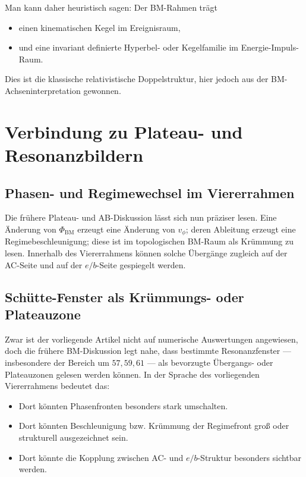 \documentclass[11pt,a4paper]{article}
\theoremstyle{definition}
\theoremstyle{plain}
\begin{document}
	Man kann daher heuristisch sagen: Der BM-Rahmen trägt
	\begin{itemize}[leftmargin=2em]
		\item einen kinematischen Kegel im Ereignisraum,
		\item und eine invariant definierte Hyperbel- oder Kegelfamilie im Energie-Impuls-Raum.
	\end{itemize}
	
	Dies ist die klassische relativistische Doppelstruktur, hier jedoch aus der BM-Achseninterpretation gewonnen.
	
	\section{Verbindung zu Plateau- und Resonanzbildern}
	
	\subsection{Phasen- und Regimewechsel im Viererrahmen}
	
	Die frühere Plateau- und AB-Diskussion lässt sich nun präziser lesen. Eine Änderung von $\Phi_{\mathrm{BM}}$ erzeugt eine Änderung von $v_\phi$; deren Ableitung erzeugt eine Regimebeschleunigung; diese ist im topologischen BM-Raum als Krümmung zu lesen. Innerhalb des Viererrahmens können solche Übergänge zugleich auf der AC-Seite und auf der $e/b$-Seite gespiegelt werden.
	
	\subsection{Schütte-Fenster als Krümmungs- oder Plateauzone}
	
	Zwar ist der vorliegende Artikel nicht auf numerische Auswertungen angewiesen, doch die frühere BM-Diskussion legt nahe, dass bestimmte Resonanzfenster --- insbesondere der Bereich um $57,59,61$ --- als bevorzugte Übergangs- oder Plateauzonen gelesen werden können. In der Sprache des vorliegenden Viererrahmens bedeutet das:
	\begin{itemize}[leftmargin=2em]
		\item Dort könnten Phasenfronten besonders stark umschalten.
		\item Dort könnten Beschleunigung bzw. Krümmung der Regimefront groß oder strukturell ausgezeichnet sein.
		\item Dort könnte die Kopplung zwischen AC- und $e/b$-Struktur besonders sichtbar werden.
	\end{itemize}
	
\end{document}
